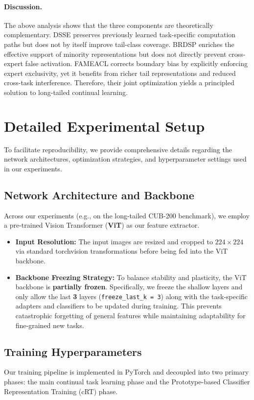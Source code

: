 \documentclass[journal]{IEEEtran}
\theoremstyle{plain}
\theoremstyle{definition}
\theoremstyle{remark}
\begin{document}
\paragraph{Discussion.}
The above analysis shows that the three components are theoretically complementary. DSSE preserves previously learned task-specific computation paths but does not by itself improve tail-class coverage. BRDSP enriches the effective support of minority representations but does not directly prevent cross-expert false activation. FAMEACL corrects boundary bias by explicitly enforcing expert exclusivity, yet it benefits from richer tail representations and reduced cross-task interference. Therefore, their joint optimization yields a principled solution to long-tailed continual learning.

\section{Detailed Experimental Setup}
\label{sec:appendix_implementation}

To facilitate reproducibility, we provide comprehensive details regarding the network architectures, optimization strategies, and hyperparameter settings used in our experiments.

\subsection{Network Architecture and Backbone}
Across our experiments (e.g., on the long-tailed CUB-200 benchmark), we employ a pre-trained Vision Transformer (\textbf{ViT}) as our feature extractor. 
\begin{itemize}
    \item \textbf{Input Resolution:} The input images are resized and cropped to \textbf{$224 \times 224$} via standard torchvision transformations before being fed into the ViT backbone.
    \item \textbf{Backbone Freezing Strategy:} To balance stability and plasticity, the ViT backbone is \textbf{partially frozen}. Specifically, we freeze the shallow layers and only allow the last \textbf{3} layers (\texttt{freeze\_last\_k = 3}) along with the task-specific adapters and classifiers to be updated during training. This prevents catastrophic forgetting of general features while maintaining adaptability for fine-grained new tasks.
\end{itemize}

\subsection{Training Hyperparameters}
Our training pipeline is implemented in PyTorch and decoupled into two primary phases: the main continual task learning phase and the Prototype-based Classifier Representation Training (cRT) phase. 
\end{document}
